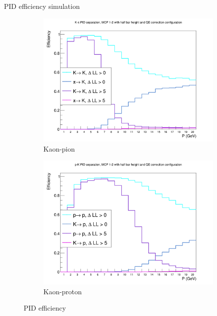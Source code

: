\documentclass{beamer}
\begin{document}
\begin{frame}{PID efficiency simulation}
  \begin{figure}
    \centering
    \vspace{-0.2cm}
    \begin{subfigure}{0.5\textwidth}
      \includegraphics[width = 1.0\textwidth]{Plots/KaonPionPIDEfficiencyStandardMCPAB.png}
      \caption{Kaon-pion}
    \end{subfigure}%
    \begin{subfigure}{0.5\textwidth}
      \includegraphics[width = 1.0\textwidth]{Plots/PionProtonPIDEfficiencyStandardMCPAB.png}
      \caption{Kaon-proton}
    \end{subfigure}
    \caption{PID efficiency}
  \end{figure}
\end{frame}
\end{document}
